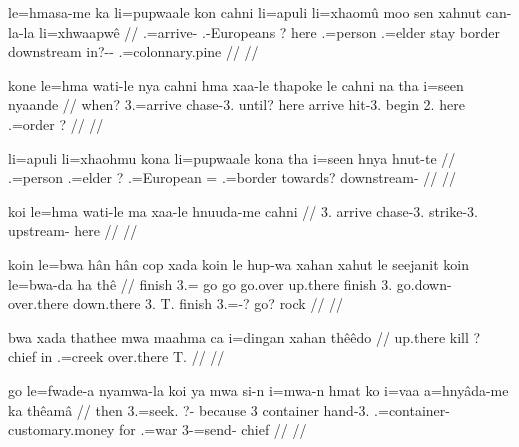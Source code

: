 \documentclass{article}
\begin{document}
\a
\begingl
\gla le=hmasa-me ka li=pupwaale kon cahni li=apuli li=xhaomû moo sen xahnut can-la-la li=xhwaapwê
// .=arrive-  .-Europeans ? here .=person .=elder stay border downstream in?-- .=colonnary.pine
// \glft {} 
// \endgl

\a
\begingl
\gla kone le=hma wati-le nya cahni hma xaa-le thapoke le cahni na tha i=seen nyaande
// \glb when? 3.=arrive chase-3. until? here arrive hit-3. begin 2. here   .=order ?
// \glft {}// 
\endgl

\a
\begingl
\gla li=apuli li=xhaohmu kona li=pupwaale kona tha i=seen hnya hnut-te
// \glb {}.=person .=elder ? .=European =  .=border towards? downstream-
// \glft {}
// \endgl

\a
\begingl
\gla koi le=hma wati-le ma xaa-le hnuuda-me cahni
// \glb {} 3. arrive chase-3.  strike-3. upstream- here
// \glft {}
// \endgl

\a
\begingl
\gla koin le=bwa hân hân cop xada koin le hup-wa xahan xahut le seejanit koin le=bwa-da ha thê
// \glb finish 3.= go go go.over up.there finish 3. go.down- over.there down.there 3. T. finish 3.=-? go? rock
// \glft {} 
// \endgl

\a
\begingl
\gla bwa xada thathee mwa maahma ca i=dingan xahan thêêdo
// \glb {} up.there kill ? chief in .=creek over.there T.
// \glft {}
// \endgl

\a
\begingl
\gla go le=fwade-a nyamwa-la koi ya mwa si-n i=mwa-n hmat ko i=vaa a=hnyâda-me ka thêamâ
// \glb then 3.=seek. ?- because 3 container hand-3. .=container- customary.money for .=war 3-=send-  chief
// \glft  {}
// \endgl
\end{document}

